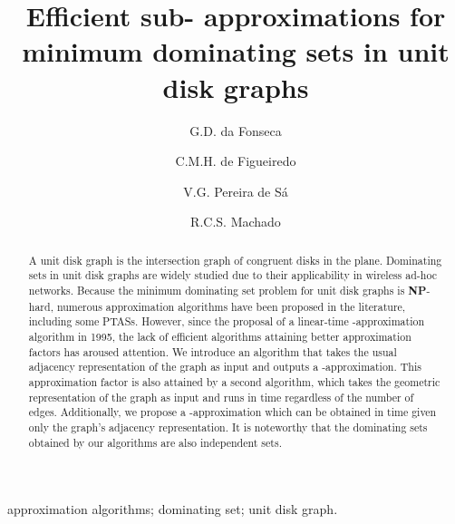 \documentclass[preprint,12pt]{elsarticle}
\begin{document}
\begin{frontmatter}

\title{Efficient sub- approximations for\\minimum dominating sets in unit disk graphs}

\author[gf]{G.D. da Fonseca}

\author[ch]{C.M.H. de Figueiredo}

\author[vs]{V.G. Pereira de S\'a}

\author[rm]{R.C.S. Machado}

\address[gf]{Universidade Federal do Estado do Rio de Janeiro, Brazil}

\address[ch,vs]{Universidade Federal do Rio de Janeiro, Brazil}

\address[rm]{Instituto Nacional de Metrologia, Qualidade e Tecnologia, Brazil}

\begin{abstract}
A unit disk graph is the intersection graph of  congruent disks in the plane. Dominating sets in unit disk graphs are widely studied due to their applicability in wireless ad-hoc networks. Because the minimum dominating set problem for unit disk graphs is \textbf{NP}-hard, numerous approximation algorithms have been proposed in the literature, including some PTASs.
However, since the proposal of a linear-time -approximation algorithm in 1995, the lack of efficient algorithms attaining better approximation factors has aroused attention.
We introduce an  algorithm that takes the usual adjacency representation of the graph as input and outputs a -approximation. This approximation factor is also attained by a second algorithm, which takes the geometric representation of the graph as input and runs in  time regardless of the number of edges.
Additionally, we propose a -approximation which can be obtained in  time given only the graph's adjacency representation. It is noteworthy that the dominating sets obtained by our algorithms are also independent sets.
\end{abstract}

\begin{keyword}
approximation algorithms; dominating set; unit disk graph.
\end{keyword}

\end{frontmatter}
\end{document}
